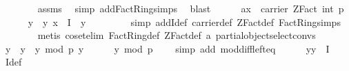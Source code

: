 \begin{isabellebody}
\ \ \ \ \ \ \isamarkupfalse%
\ assms\ \isamarkupfalse%
\ {\isacharparenleft}{\kern0pt}simp\ add{\isacharcolon}{\kern0pt}FactRing{\isacharunderscore}{\kern0pt}simps{\isacharparenright}{\kern0pt}\ \isamarkupfalse%
\ blast\isanewline
\ \ \ \ \isamarkupfalse%
\ a{\isacharcolon}{\kern0pt}{\isachardoublequoteopen}x\ {\isasymin}\ carrier\ {\isacharparenleft}{\kern0pt}ZFact\ {\isacharparenleft}{\kern0pt}int\ p{\isacharparenright}{\kern0pt}{\isacharparenright}{\kern0pt}{\isachardoublequoteclose}\isanewline
\ \ \ \ \isamarkupfalse%
\ y{\isacharprime}{\kern0pt}\ \ y{\isacharunderscore}{\kern0pt}{}{\isacharcolon}{\kern0pt}\ {\isachardoublequoteopen}x\ {\isacharequal}{\kern0pt}\ I\ {\isacharplus}{\kern0pt}{\isachargreater}{\kern0pt}\isactrlbsub {\isasymZ}\isactrlesub \ y{\isacharprime}{\kern0pt}{\isachardoublequoteclose}\ \isanewline
\ \ \ \ \ \ \isamarkupfalse%
\ {\isacharparenleft}{\kern0pt}simp\ add{\isacharcolon}{\kern0pt}I{\isacharunderscore}{\kern0pt}def\ carrier{\isacharunderscore}{\kern0pt}def\ ZFact{\isacharunderscore}{\kern0pt}def\ FactRing{\isacharunderscore}{\kern0pt}simps{\isacharparenright}{\kern0pt}\isanewline
\ \ \ \ \ \ \isamarkupfalse%
\ {\isacharparenleft}{\kern0pt}metis\ coset{\isacharunderscore}{\kern0pt}elim\ FactRing{\isacharunderscore}{\kern0pt}def\ ZFact{\isacharunderscore}{\kern0pt}def\ a\ partial{\isacharunderscore}{\kern0pt}object{\isachardot}{\kern0pt}select{\isacharunderscore}{\kern0pt}convs{\isacharparenleft}{\kern0pt}{}{\isacharparenright}{\kern0pt}{\isacharparenright}{\kern0pt}\isanewline
\ \ \ \ \isamarkupfalse%
\ y\ \ {\isachardoublequoteopen}y\ {\isacharequal}{\kern0pt}\ y{\isacharprime}{\kern0pt}\ mod\ p\ {\isacharminus}{\kern0pt}y{\isacharprime}{\kern0pt}{\isachardoublequoteclose}\isanewline
\ \ \ \ \isamarkupfalse%
\ {\isachardoublequoteopen}y\ mod\ p\ {\isacharequal}{\kern0pt}\ {}{\isachardoublequoteclose}\ \isamarkupfalse%
\ {\isacharparenleft}{\kern0pt}simp\ add{\isacharcolon}{\kern0pt}\ mod{\isacharunderscore}{\kern0pt}diff{\isacharunderscore}{\kern0pt}left{\isacharunderscore}{\kern0pt}eq{\isacharparenright}{\kern0pt}\isanewline
\ \ \ \ \isamarkupfalse%
\ y{\isacharunderscore}{\kern0pt}{}{\isacharcolon}{\kern0pt}{\isachardoublequoteopen}y\ {\isasymin}\ I{\isachardoublequoteclose}\ \isamarkupfalse%
\ I{\isacharunderscore}{\kern0pt}def\ \isanewline

\end{isabellebody}
